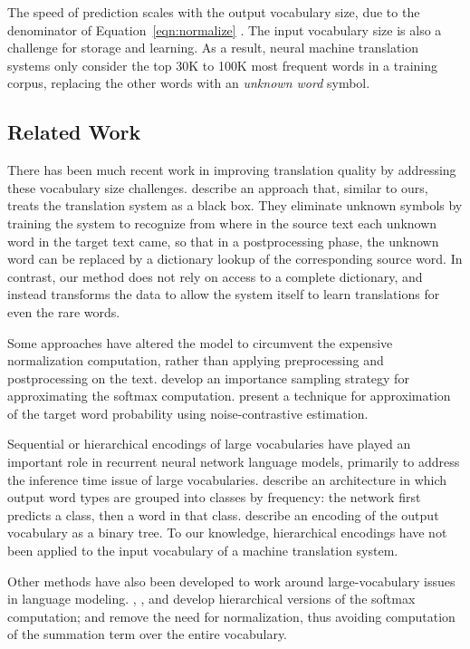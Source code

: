 The speed of prediction scales with the output vocabulary size, due to the
denominator of Equation~\ref{eqn:normalize} \cite{journals/corr/JeanCMB14}. The
input vocabulary size is also a challenge for storage and learning. As a
result, neural machine translation systems only consider the top 30K to 100K
most frequent words in a training corpus, replacing the other words with an
\emph{unknown word} symbol.

\subsection{Related Work}

There has been much recent work in improving translation quality by addressing
these vocabulary size challenges.  describe
an approach that, similar to ours, treats the translation system as a black
box. They eliminate unknown symbols by training the system to recognize from
where in the source text each unknown word in the target text came, so that in
a postprocessing phase, the unknown word can be replaced by a dictionary lookup
of the corresponding source word. In contrast, our method does not rely on
access to a complete dictionary, and instead transforms the data to allow the
system itself to learn translations for even the rare words.

Some approaches have altered the model to circumvent the expensive
normalization computation, rather than applying preprocessing and
postprocessing on the text.  develop an
importance sampling strategy for approximating the softmax computation.
 present a technique for approximation of the target
word probability using noise-contrastive estimation.

Sequential or hierarchical encodings of large vocabularies have played an
important role in recurrent neural network language models, primarily to
address the inference time issue of large vocabularies. 
describe an architecture in which output word types are grouped into classes by
frequency: the network first predicts a class, then a word in that
class.  describe an encoding of the output
vocabulary as a binary tree. To our knowledge, hierarchical encodings have not
been applied to the input vocabulary of a machine translation system.

Other methods have also been developed to work around large-vocabulary issues
in language modeling. ,
, and  develop hierarchical versions
of the softmax computation;  and
 remove the need for normalization,
thus avoiding computation of the summation term over the entire vocabulary.

